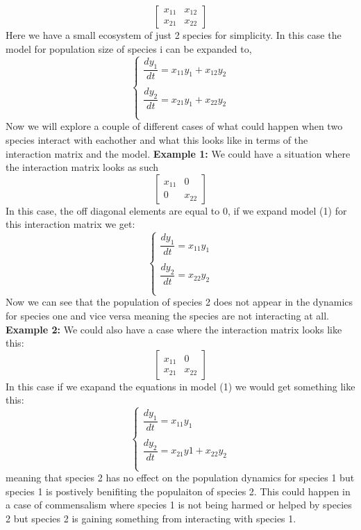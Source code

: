 \documentclass{article}
\begin{document}
$$
\begin{bmatrix}
x_{11}&x_{12} \\
x_{21}&x_{22}
\end{bmatrix}
$$
\hfill\break \hfill\break
Here we have a small ecosystem of just 2 species for simplicity. In this case the model for population size of species i can be expanded to, 
\hfill\break
\hfill\break
\begin{equation}
\begin{cases}
\dfrac{dy_1}{dt}=x_{11}y_1+x_{12}y_2\\\\
\dfrac{dy_2}{dt}=x_{21}y_1+x_{22}y_2\\\\
\end{cases}
\end{equation}
\hfill\break
\hfill\break
Now we will explore a couple of different cases of what could happen when two species interact with eachother and what this looks like in terms of the interaction matrix and the model.
\hfill\break
\hfill\break
\textbf{Example 1:}\hfill\break
\hfill\break
We could have a situation where the interaction matrix looks as such \hfill\break
$$
\begin{bmatrix}
x_{11}&0 \\
0&x_{22} 
\end{bmatrix}
$$
In this case, the off diagonal elements are equal to 0, if we expand model (1) for this interaction matrix we get:
\begin{equation}
\begin{cases}
\dfrac{dy_1}{dt}=x_{11}y_1\\\\
\dfrac{dy_2}{dt}=x_{22}y_2\\\\
\end{cases}
\end{equation}
Now we can see that the population of species 2 does not appear in the dynamics for species one and vice versa meaning the species are not interacting at all.\hfill\break\hfill\break\hfill\break
\textbf{Example 2:} \hfill\break\hfill\break
We could also have a case where the interaction matrix looks like this:
$$
\begin{bmatrix}
x_{11}&0 \\
x_{21}&x_{22} 
\end{bmatrix}
$$
In this case if we exapand the equations in model (1) we would get something like this:
\begin{equation}
\begin{cases}
\dfrac{dy_1}{dt}=x_{11}y_1\\\\
\dfrac{dy_2}{dt}=x_{21}y1+x_{22}y_2\\\\
\end{cases}
\end{equation}
meaning that species 2 has no effect on the population dynamics for species 1 but species 1 is postively benifiting the populaiton of species 2. This could happen in a case of commensalism where species 1 is not being harmed or helped by species 2 but species 2 is gaining something from interacting with species 1.
\hfill\break\hfill\break\hfill\break
\end{document}
